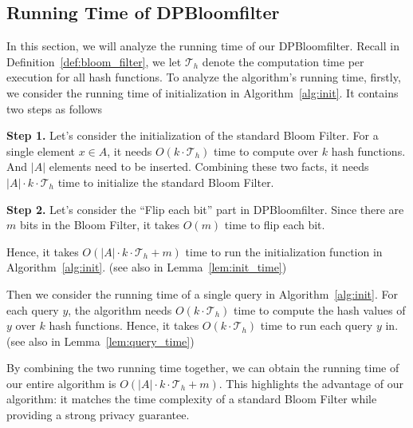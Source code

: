 \subsection{Running Time of DPBloomfilter}\label{sec:tec_time_dp}
In this section, we will analyze the running time of our DPBloomfilter. 
Recall in Definition~\ref{def:bloom_filter}, we let $\mathcal{T}_{h}$ denote the computation time per execution for all hash functions. To analyze the algorithm's running time, firstly, we consider the running time of initialization in Algorithm~\ref{alg:init}. It contains two steps as follows

\textbf{Step 1.} Let's consider the initialization of the standard Bloom Filter. For a single element $x \in A$, it needs $O(k\cdot \mathcal{T}_h)$ time to compute over $k$ hash functions. And $|A|$ elements need to be inserted. Combining these two facts, it needs $|A|\cdot k \cdot \mathcal{T}_h$ time to initialize the standard Bloom Filter.

\textbf{Step 2.} Let's consider the ``Flip each bit'' part in DPBloomfilter. Since there are $m$ bits in the Bloom Filter, it takes $O(m)$ time to flip each bit.

Hence, it takes $O(|A|\cdot k \cdot \mathcal{T}_{h}+m)$ time to run the initialization function in Algorithm~\ref{alg:init}. (see also in Lemma~\ref{lem:init_time})

Then we consider the running time of a single query in Algorithm~\ref{alg:init}. For each query $y$, the algorithm needs $O(k \cdot \mathcal{T}_{h})$ time to compute the hash values of $y$ over $k$ hash functions. Hence, it takes $O(k \cdot \mathcal{T}_{h})$ time to run each query $y$ in. (see also in Lemma~\ref{lem:query_time})

By combining the two running time together, we can obtain the running time of our entire algorithm is $O(|A|\cdot k \cdot \mathcal{T}_{h}+m)$. This highlights the advantage of our algorithm: it matches the time complexity of a standard Bloom Filter while providing a strong privacy guarantee.

